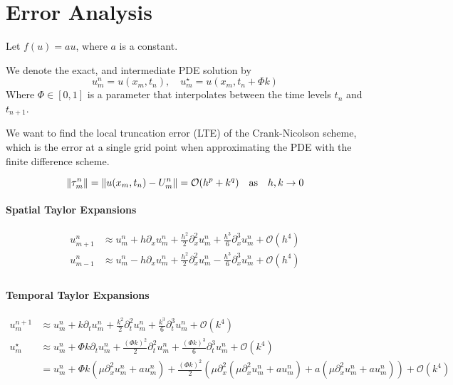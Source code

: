 \section{Error Analysis}
Let \(f(u) = a u\), where \(a\) is a constant.

We denote the exact, and intermediate PDE solution by
\[
  u_m^n = u(x_m, t_n), \quad u_m^\star = u(x_m, t_n + \Phi k)
\]
Where \(\Phi \in [0, 1]\) is a parameter that interpolates between the time levels \(t_n\) and \(t_{n+1}\).

We want to find the local truncation error (LTE) of the Crank-Nicolson scheme, which is the error at a single grid point when approximating the PDE with the finite difference scheme.

\[
  \lVert\tau_m^n\rVert = \lVert u(x_m, t_n) - U_m^n\rVert = \mathcal{O}(h^p + k^q) \quad \text{as} \quad h, k \to 0
\]


\paragraph{Spatial Taylor Expansions}
\begin{align*}
  u_{m+1}^n & \approx u_m^n + h \partial_x u_m^n + \frac{h^2}{2} \partial_x^2 u_m^n + \frac{h^3}{6} \partial_x^3 u_m^n + \mathcal{O}(h^4) \\
  u_{m-1}^n & \approx u_m^n - h \partial_x u_m^n + \frac{h^2}{2} \partial_x^2 u_m^n - \frac{h^3}{6} \partial_x^3 u_m^n + \mathcal{O}(h^4) \\
\end{align*}

\paragraph{Temporal Taylor Expansions}
\begin{align*}
  u_m^{n+1} & \approx u_m^n + k \partial_t u_m^n + \frac{k^2}{2} \partial_t^2 u_m^n + \frac{k^3}{6} \partial_t^3 u_m^n + \mathcal{O}(k^4)                                                                                                            \\
  u_m^\star & \approx u_m^n + \Phi k \partial_t u_m^n + \frac{(\Phi k)^2}{2} \partial_t^2 u_m^n + \frac{(\Phi k)^3}{6} \partial_t^3 u_m^n + \mathcal{O}(k^4)                                                                                         \\
            & = u_m^n + \Phi k \left(\mu \partial_x^2 u_m^n + a u_m^n\right) + \frac{(\Phi k)^2}{2} \left(\mu \partial_x^2 \left(\mu \partial_x^2 u_m^n + a u_m^n\right) + a \left(\mu \partial_x^2 u_m^n + a u_m^n\right)\right) + \mathcal{O}(k^4) \\
\end{align*}

